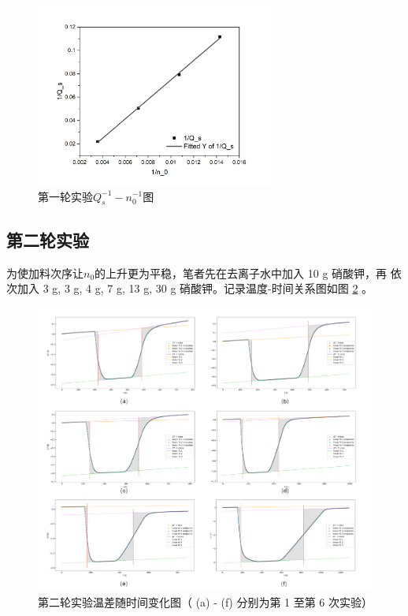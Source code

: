 \documentclass[cn,hazy,pku,12pt,normal,math=newtx,cite=super]{elegantnote}
\begin{document}
\begin{figure}[htbp]
    \centering
    \includegraphics[width = 0.70\textwidth]{image/Graph4.png}
    \caption{第一轮实验$Q_s^{-1}-n_0^{-1}$图}\label{3}
\end{figure}
\subsection{第二轮实验}
为使加料次序让$n_0$的上升更为平稳，笔者先在去离子水中加入 10 g 硝酸钾，再
依次加入 3 g, 3 g, 4 g, 7 g, 13 g, 30 g 硝酸钾。记录温度-时间关系图如图 \ref{4} 。

\begin{figure}[htbp]
    \centering
    \includegraphics[width = \textwidth]{image/r2.png}
    \caption{第二轮实验温差随时间变化图（ (a) - (f) 分别为第 1 至第 6 次实验）}\label{4}
\end{figure}
\end{document}
